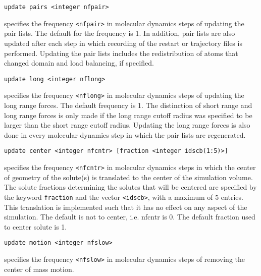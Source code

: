 \begin{description}
\item
\begin{verbatim}
update pairs <integer nfpair>
\end{verbatim}
specifies the frequency \verb+<nfpair>+ in molecular dynamics steps of 
updating the pair lists. The default for the frequency is 1.
In addition, pair lists are also updated after each step in which
recording of the restart or trajectory files is performed. Updating
the pair lists includes the redistribution of atoms that changed
domain and load balancing, if specified.

\item
\begin{verbatim}
update long <integer nflong>
\end{verbatim}
specifies the frequency \verb+<nflong>+ in molecular dynamics steps 
of updating the long range forces. The default frequency is 1.
The distinction of short range and long range forces is only
made if the long range cutoff radius was specified to be larger
than the short range cutoff radius. Updating the long range forces
is also done in every molecular dynamics step in which the
pair lists are regenerated.

\item
\begin{verbatim}
update center <integer nfcntr> [fraction <integer idscb(1:5)>]
\end{verbatim}
specifies the frequency \verb+<nfcntr>+ in molecular dynamics steps in 
which the center of geometry of the solute(s) is translated to the
center of the simulation volume. The solute fractions determining the
solutes that will be centered are specified by the keyword 
{\tt fraction} and the vector \verb+<idscb>+, with a maximum of 5 entries.
This translation is implemented such that it has no effect on any 
aspect of the simulation. The default is not to center, i.e. nfcntr is
0. The default fraction used to center solute is 1.

\item
\begin{verbatim}
update motion <integer nfslow>
\end{verbatim}
specifies the frequency \verb+<nfslow>+ in molecular dynamics steps of
removing the center of mass motion.


\end{description}
